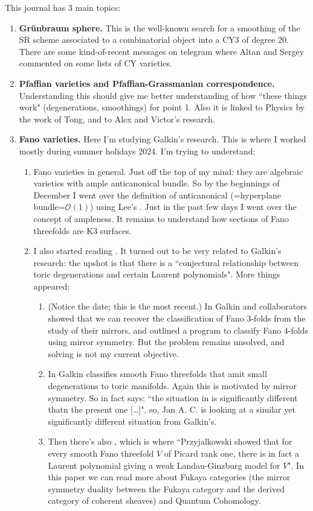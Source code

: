 This journal has 3 main topics: 
\begin{enumerate}
	\item \textbf{Grünbraum sphere.} This is the well-known search for a smoothing of the SR scheme associated to a combinatorial object into a CY3 of degree 20. {\color{2}There are some kind-of-recent messages on telegram} where Altan and Sergey commented on some lists of CY varieties.
\item \textbf{Pfaffian varieties and Pfaffian-Grassmanian correspondence.} Understanding this should give me better understanding of how ``these things work" (degenerations, smoothings) for point 1. Also it is linked to Physics by the work of Tong, and to Alex and Victor's research.
\item \textbf{Fano varieties.} Here I'm studying Galkin's research. This is where I worked mostly during summer holidays 2024. I'm trying to understand:
	\begin{enumerate}[label=(\alph*)]
		\item Fano varieties in general. Just off the top of my mind: they are algebraic varieties with ample anticanonical bundle. So by the beginnings of December I went over the definition of anticanonical (=hyperplane bundle=\(\mathcal{O}(1)\)) using Lee's  \cite{lec}. Just in the past few days I went over the concept of ampleness. {\color{2}It remains} to understand how sections of Fano threefolds are K3 surfaces.
		\item I also started reading \cite{jan4}. It turned out to be very related to Galkin's research: the upshot is that there is a ``conjectural relationship between toric degenerations and certain Laurent polynomials". More things appeared:
			\begin{enumerate}
			\item (Notice the date; this is the most recent.) In \cite{mifa} Galkin and collaborators showed that we can recover the classification of Fano 3-folds from the study of their mirrors, and outlined a program to classify Fano 4-folds using mirror symmetry. But the problem remains unsolved, and solving is not my current objective.
			\item In \cite{galkin1} Galkin classifies smooth Fano threefolds that amit small degenerations to toric manifolds. Again this is motivated by mirror symmetry. So in fact \cite{jan4} says: ``the situation in \cite{galkin1} is significantly different thatn the present one […]", so, Jan A. C. is looking at a similar yet significantly different situation from Galkin's.
			\item Then there's also \cite{prz09}, which is where ``Przyjalkowski showed that for every smooth Fano threefold $V$ of Picard rank one, there is in fact a Laurent polynomial giving a weak Landau-Ginzburg model for $V$". In this paper we can read more about Fukaya categories (the mirror symmetry duality between the Fukaya category and the derived category of coherent sheaves) and Quantum Cohomology.

\end{enumerate}
\end{enumerate}
\end{enumerate}
